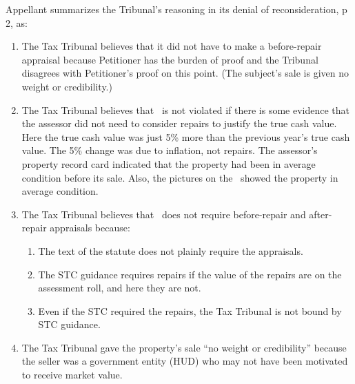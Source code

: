 Appellant summarizes the Tribunal's reasoning in its denial of reconsideration, p 2, as:

\begin{enumerate}
  
\item The Tax Tribunal believes that it did not have to make a before-repair appraisal because Petitioner has the burden of proof and the Tribunal disagrees with Petitioner's proof on this point. (The subject's sale is given no weight or credibility.)
  
\item The Tax Tribunal believes that \mathieuGast\ is not violated if there is some evidence that the assessor did not need to consider repairs to justify the true cash value. Here the true cash value was just 5\% more than the previous year's true cash value. The 5\% change was due to inflation, not repairs. The assessor's property record card indicated that the property had been in average condition before its sale. Also, the pictures on the \MLS\ showed the property in average condition.
  
\item The Tax Tribunal believes that \mathieuGast\ does not require before-repair and after-repair appraisals because:
  \begin{enumerate}
  \item The text of the statute does not plainly require the appraisals.
  \item The STC guidance requires repairs if the value of the repairs are on the assessment roll, and here they are not.
  \item Even if the STC required the repairs, the Tax Tribunal is not bound by STC guidance.
  \end{enumerate}

\item The Tax Tribunal gave the property's sale ``no weight or credibility'' because the seller was a government entity (HUD) who may not have been motivated to receive market value.
  
\end{enumerate}


	
